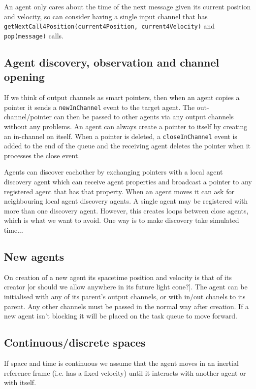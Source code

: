 \documentclass[a4paper]{article}
\begin{document}
An agent only cares about the time of the next message given its current position and velocity, so can consider having a single input channel that has \texttt{getNextCall4Position(current4Position, current4Velocity)} and \texttt{pop(message)} calls.

\subsection{Agent discovery, observation and channel opening}

If we think of output channels as smart pointers, then when an agent copies a pointer it sends a \texttt{newInChannel} event to the target agent. The out-channel/pointer can then be passed to other agents via any output channels without any problems. An agent can always create a pointer to itself by creating an in-channel on itself. When a pointer is deleted, a \texttt{closeInChannel} event is added to the end of the queue and the receiving agent deletes the pointer when it processes the close event.

Agents can discover eachother by exchanging pointers with a local agent discovery agent which can receive agent properties and broadcast a pointer to any registered agent that has that property. When an agent moves it can ask for neighbouring local agent discovery agents. A single agent may be registered with more than one discovery agent. However, this creates loops between close agents, which is what we want to avoid. One way is to make discovery take simulated time...

\subsection{New agents}

On creation of a new agent its spacetime position and velocity is that of its creator [or should we allow anywhere in its future light cone?]. The agent can be initialised with any of its parent's output channels, or with in/out chanels to its parent. Any other channels must be passed in the normal way after creation. If a new agent isn't blocking it will be placed on the task queue to move forward.

\subsection{Continuous/discrete spaces}

If space and time is continuous we assume that the agent moves in an inertial reference frame (i.e. has a fixed velocity) until it interacts with another agent or with itself.
\end{document}
